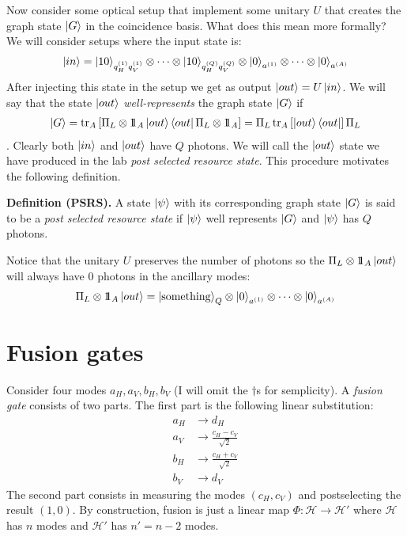 \documentclass{article}
\newcommand{\unit}{1\!\!1}
\begin{document}
Now consider some optical setup that implement some unitary $U$ that creates the graph state $\ket G$ in the coincidence basis. What does this mean more formally? We will consider setups where the input state is:
\begin{align*}
   \ket{in} = \ket{10}_{q^{(1)}_Hq^{(1)}_V} \otimes \dots \otimes \ket{10}_{q^{(Q)}_Hq^{(Q)}_V} \otimes \ket{0}_{a^{(1)}} \otimes \dots \otimes \ket{0}_{a^{(A)}}
\end{align*}
After injecting this state in the setup we get as output $\ket{out} = U\ket{in}$. We will say that the state $\ket{out}$ \textit{well-represents} the graph state $\ket{G}$ if
\begin{align*}
    \ket{G} = \tr_A\left[\Pi_L \otimes \unit_A \ket{out}\bra{out}\Pi_L \otimes \unit_A\right] = \Pi_L \tr_A\left[\ket{out}\bra{out}\right] \Pi_L
\end{align*}.
Clearly both $\ket{in}$ and $\ket{out}$ have $Q$ photons. We will call the $\ket{out}$ state we have produced in the lab \textit{post selected resource state}. This procedure motivates the following definition.

\textbf{Definition (PSRS).} A state $\ket{\psi}$ with its corresponding graph state $\ket{G}$ is said to be a \textit{post selected resource state} if $\ket{\psi}$ well represents $\ket{G}$ and $\ket{\psi}$ has $Q$ photons.

Notice that the unitary $U$ preserves the number of photons so the $\Pi_L \otimes \unit_A \ket{out}$ will always have $0$ photons in the ancillary modes:
\begin{align*}
    \Pi_L \otimes \unit_A \ket{out}  = \ket{\text{something}}_Q \otimes \ket{0}_{a^{(1)}} \otimes \dots \otimes \ket{0}_{a^{(A)}} 
\end{align*}

\newpage
\section{Fusion gates}
Consider four modes $a_H, a_V, b_H, b_V$ (I will omit the $\dagger$s for semplicity). A \textit{fusion gate} consists of two parts. The first part is the following linear substitution:
\begin{align*}
    a_H &\rightarrow d_H \\
    a_V &\rightarrow \frac{c_H-c_V}{\sqrt{2}} \\
    b_H &\rightarrow \frac{c_H+c_V}{\sqrt{2}} \\
    b_V &\rightarrow d_V
\end{align*}
The second part consists in measuring the modes $(c_H, c_V)$ and postselecting the result $(1, 0)$. By construction, fusion is just a linear map $\Phi: \mathcal{H} \rightarrow \mathcal{H'}$ where $\mathcal{H}$ has $n$ modes and $\mathcal{H'}$ has $n' = n-2$ modes.
\end{document}
